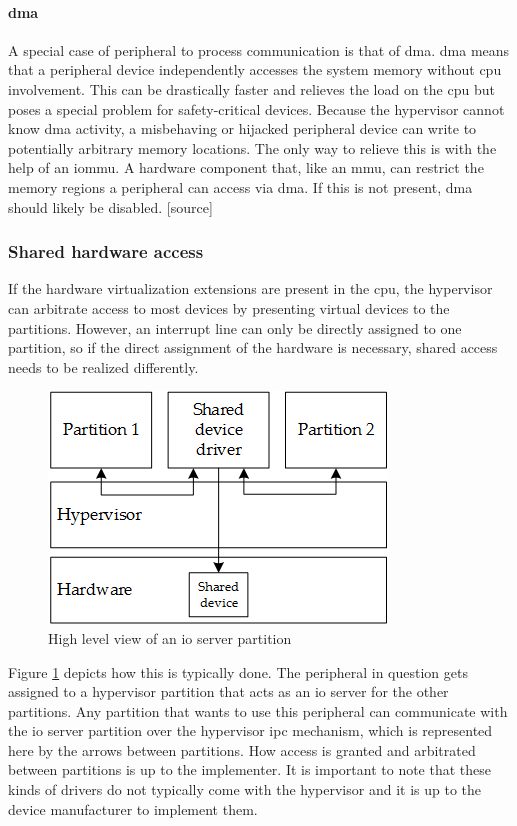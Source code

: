 \paragraph{\acrshort{dma}}
A special case of peripheral to process communication is that of \acrfull{dma}. \acrshort{dma} means that a peripheral device independently accesses the system memory without \acrshort{cpu} involvement. This can be drastically faster and relieves the load on the \acrshort{cpu} but poses a special problem for safety-critical devices. Because the hypervisor cannot know \acrshort{dma} activity, a misbehaving or hijacked peripheral device can write to potentially arbitrary memory locations. The only way to relieve this is with the help of an \acrfull{iommu}. A hardware component that, like an \acrshort{mmu}, can restrict the memory regions a peripheral can access via \acrshort{dma}.
If this is not present, \acrshort{dma} should likely be disabled. [source]

\subsubsection{Shared hardware access}
If the hardware virtualization extensions are present in the \acrshort{cpu}, the hypervisor can arbitrate access to most devices by presenting virtual devices to the partitions.
However, an interrupt line can only be directly assigned to one partition, so if the direct assignment of the hardware is necessary, shared access needs to be realized differently. 

\begin{figure}[hbt!]
\centering
\includegraphics[scale=1]{Figures/shared_driver.png}
\decoRule
\caption{High level view of an \acrshort{io} server partition}
\label{fig:shared_driver}
\end{figure}
Figure \ref{fig:shared_driver} depicts how this is typically done. The peripheral in question gets assigned to a hypervisor partition that acts as an \acrshort{io} server for the other partitions. Any partition that wants to use this peripheral can communicate with the \acrshort{io} server partition over the hypervisor \acrshort{ipc} mechanism, which is represented here by the arrows between partitions. How access is granted and arbitrated between partitions is up to the implementer. It is important to note that these kinds of drivers do not typically come with the hypervisor and it is up to the device manufacturer to implement them.

